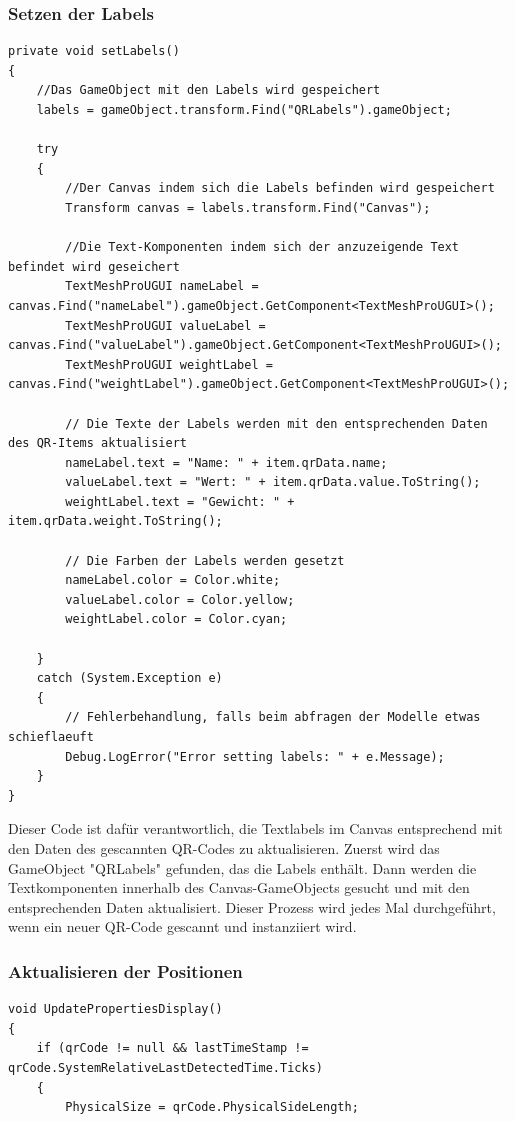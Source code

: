\begin{itemize}
\subsubsection*{Setzen der Labels}
\begin{lstlisting}[style=csharp, caption={Setzen der Labels}, label=code:labels]
private void setLabels()
{
    //Das GameObject mit den Labels wird gespeichert
    labels = gameObject.transform.Find("QRLabels").gameObject;

    try
    {
        //Der Canvas indem sich die Labels befinden wird gespeichert
        Transform canvas = labels.transform.Find("Canvas");

        //Die Text-Komponenten indem sich der anzuzeigende Text befindet wird geseichert
        TextMeshProUGUI nameLabel = canvas.Find("nameLabel").gameObject.GetComponent<TextMeshProUGUI>();
        TextMeshProUGUI valueLabel = canvas.Find("valueLabel").gameObject.GetComponent<TextMeshProUGUI>();
        TextMeshProUGUI weightLabel = canvas.Find("weightLabel").gameObject.GetComponent<TextMeshProUGUI>();

        // Die Texte der Labels werden mit den entsprechenden Daten des QR-Items aktualisiert
        nameLabel.text = "Name: " + item.qrData.name;
        valueLabel.text = "Wert: " + item.qrData.value.ToString();
        weightLabel.text = "Gewicht: " + item.qrData.weight.ToString();

        // Die Farben der Labels werden gesetzt
        nameLabel.color = Color.white;
        valueLabel.color = Color.yellow;
        weightLabel.color = Color.cyan;

    }
    catch (System.Exception e)
    {
        // Fehlerbehandlung, falls beim abfragen der Modelle etwas schieflaeuft
        Debug.LogError("Error setting labels: " + e.Message);
    }
}
\end{lstlisting}

Dieser Code ist dafür verantwortlich, die Textlabels im Canvas entsprechend mit den Daten des gescannten QR-Codes zu aktualisieren. Zuerst wird das GameObject "QRLabels" gefunden, das die Labels enthält. Dann werden die Textkomponenten innerhalb des Canvas-GameObjects gesucht und mit den entsprechenden Daten aktualisiert. Dieser Prozess wird jedes Mal durchgeführt, wenn ein neuer QR-Code gescannt und instanziiert wird.

\subsubsection*{Aktualisieren der Positionen}
\begin{lstlisting}[style=csharp, caption={Aktualisieren der Position}, label=code:Aktualisieren der Position]
void UpdatePropertiesDisplay()
{
    if (qrCode != null && lastTimeStamp != qrCode.SystemRelativeLastDetectedTime.Ticks)
    {
        PhysicalSize = qrCode.PhysicalSideLength;


\end{lstlisting}
\end{itemize}
